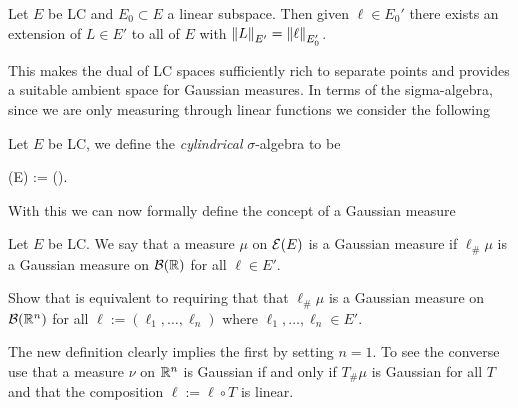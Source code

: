 \documentclass[
    a4paper,
    DIV=14,
    abstract=true,
    numbers=noenddot
]{scrartcl}
\begin{document}
\begin{theorem}
    Let $E$ be LC and $E_0 \subset E$  a linear subspace. Then given $ \ell \in E_0'$ there exists an extension of $L \in E'$ to all of $E$ with $\left\lVert L \right\rVert_{E'}=\left\lVert \ell \right\rVert_{E_0'}$.
\end{theorem}
This makes the dual of LC spaces  sufficiently rich to separate points and provides a suitable ambient space for Gaussian measures. In terms of the sigma-algebra, since we are only measuring through linear functions we consider the following
\begin{definition}
    Let $E$ be LC, we define the \emph{cylindrical} $\sigma$-algebra to be 
    \begin{aligneq*}
        \Ee(E) := \sigma(). 
    \end{aligneq*}     
\end{definition}
With this we can now formally define the concept of a Gaussian measure
\begin{definition}\label{GM def}
    Let $E$ be LC. We say that a measure $\mu$ on $\mathcal{E}(E)$ is a Gaussian measure if $\ell _{\#}\mu$ is a Gaussian measure on $\mathcal{B}(\mathbb{R})$ for all $\ell \in E'$.
\end{definition} 
\begin{exercise}
    Show that  is equivalent to requiring that that $\bm{\ell }_{\#}\mu$ is a Gaussian measure on $\mathcal{B}(\mathbb{R}^n)$ for all $\bm{\ell }:=(\ell_1,\ldots, \ell _n )$ where $\ell _1,\ldots, \ell _n \in E'$.
    \exerciseSymbol
\end{exercise}
\begin{hint}
The new definition clearly implies the first by setting $n=1$. To see the converse use that a measure $\nu$ on $\mathbb{R}^n$ is Gaussian if and only if $T_{\#}\mu$ is Gaussian for all $T$ and that the composition $\ell :=\bm{\ell }\circ T$ is linear.
\end{hint}
\end{document}
